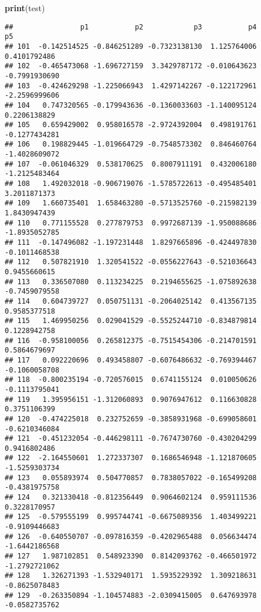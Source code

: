 \documentclass[
]{article}
\newenvironment{Shaded}{\begin{snugshade}}{\end{snugshade}}
\newcommand{\FunctionTok}[1]{\textcolor[rgb]{0.13,0.29,0.53}{\textbf{#1}}}
\newcommand{\NormalTok}[1]{#1}
\begin{document}
\begin{Shaded}
\begin{Highlighting}[]
\FunctionTok{print}\NormalTok{(test)}
\end{Highlighting}
\end{Shaded}

\begin{verbatim}
##                p1           p2            p3           p4            p5
## 101  -0.142514525 -0.846251289 -0.7323138130  1.125764006  0.4101792486
## 102  -0.465473068 -1.696727159  3.3429787172 -0.010643623 -0.7991930690
## 103  -0.424629298 -1.225066943  1.4297142267 -0.122172961 -2.2596999606
## 104   0.747320565 -0.179943636 -0.1360033603 -1.140095124  0.2206138829
## 105   0.659429002  0.958016578 -2.9724392004  0.498191761 -0.1277434281
## 106   0.198829445 -1.019664729 -0.7548573302  0.846460764 -1.4028609072
## 107  -0.061046329  0.538170625  0.8007911191  0.432006180 -1.2125483464
## 108   1.492032018 -0.906719076 -1.5785722613 -0.495485401  3.2011871373
## 109   1.660735401  1.658463280 -0.5713525760 -0.215982139  1.8430947439
## 110   0.771155528  0.277879753  0.9972687139 -1.950088686 -1.8935052785
## 111  -0.147496082 -1.197231448  1.8297665896 -0.424497830 -0.1011468538
## 112   0.507821910  1.320541522 -0.0556227643 -0.521036643  0.9455660615
## 113   0.336507080  0.113234225  0.2194655625 -1.075892638 -0.7459079558
## 114   0.604739727  0.050751131 -0.2064025142  0.413567135  0.9585377518
## 115   1.469950256  0.029041529 -0.5525244710 -0.834879814  0.1228942758
## 116  -0.958100056  0.265812375 -0.7515454306 -0.214701591  0.5864679697
## 117   0.092220696  0.493458807 -0.6076486632 -0.769394467 -0.1060058708
## 118  -0.800235194 -0.720576015  0.6741155124  0.010050626 -0.1113795041
## 119   1.395956151 -1.312060893  0.9076947612  0.116630828  0.3751106399
## 120  -0.474225018  0.232752659 -0.3858931968 -0.699058601 -0.6210346084
## 121  -0.451232054 -0.446298111 -0.7674730760 -0.430204299  0.9416802486
## 122  -2.164550601  1.272337307  0.1686546948 -1.121870605 -1.5259303734
## 123   0.055893974  0.504770857  0.7838057022 -0.165499208 -0.4381975758
## 124   0.321330418 -0.812356449  0.9064602124  0.959111536  0.3228170957
## 125  -0.579555199  0.995744741 -0.6675089356  1.403499221 -0.9109446683
## 126  -0.640550707 -0.097816359 -0.4202965488  0.056634474 -1.6442186568
## 127   1.987102851  0.548923390  0.8142093762 -0.466501972 -1.2792721062
## 128   1.326271393 -1.532940171  1.5935229392  1.309218631 -0.8625078483
## 129  -0.263350894 -1.104574883 -2.0309415005  0.647693978 -0.0582735762

\end{verbatim}
\end{document}
